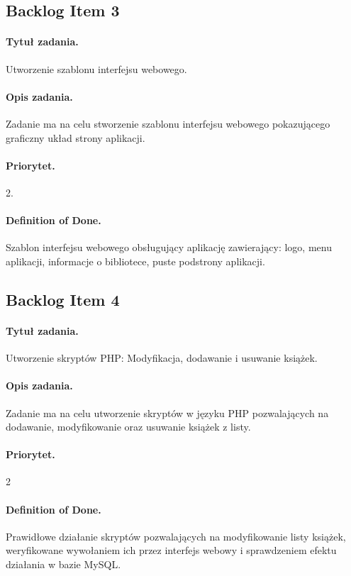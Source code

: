 \documentclass[a4paper]{article}
\begin{document}
\subsection{Backlog Item 3}
\paragraph{Tytuł zadania.} Utworzenie szablonu interfejsu webowego.
\paragraph{Opis zadania.} Zadanie ma na celu stworzenie szablonu interfejsu webowego pokazującego graficzny układ strony aplikacji.
\paragraph{Priorytet.} 2.
\paragraph{Definition of Done.}Szablon interfejsu webowego obsługujący aplikację zawierający: logo, menu aplikacji, informacje o bibliotece, puste podstrony aplikacji.

\subsection{Backlog Item 4} 
\paragraph{Tytuł zadania.} Utworzenie skryptów PHP: Modyfikacja, dodawanie i usuwanie książek.
\paragraph{Opis zadania.} Zadanie ma na celu utworzenie skryptów w języku PHP pozwalających na dodawanie, modyfikowanie oraz usuwanie książek z listy.
\paragraph{Priorytet.} 2
\paragraph{Definition of Done.} Prawidłowe działanie skryptów pozwalających na modyfikowanie listy książek, weryfikowane wywołaniem ich przez interfejs webowy i sprawdzeniem efektu działania w bazie MySQL.
\end{document}
